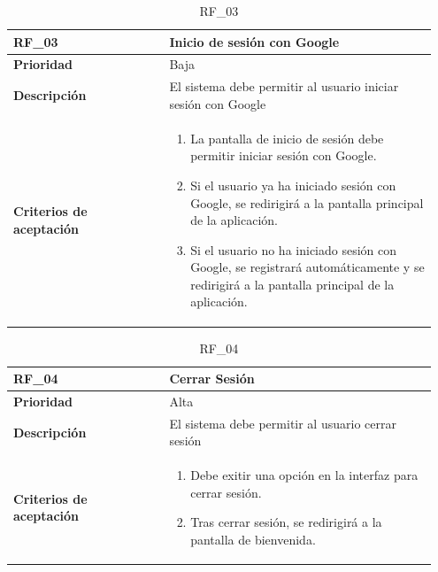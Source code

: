 \begin{table}[htb!]
    \begin{tabular}{|p{0.35\linewidth}|p{0.6\linewidth}|}
        \hline
        \rowcolor[HTML]{C0C0C0}  
        \textbf{RF\_03} & \textbf{Inicio de sesión con Google} \\
        \hline
        \textbf{Prioridad} & Baja \\
        \hline
        \textbf{Descripción} & El sistema debe permitir al usuario iniciar sesión con Google  \\
        \hline
        \vspace{0.5mm}
        \textbf{Criterios de aceptación} & 
        \begin{minipage}[t]{0.9\linewidth}
            \begin{enumerate}
                \item La pantalla de inicio de sesión debe permitir iniciar sesión con Google.
                \item Si el usuario ya ha iniciado sesión con Google, se redirigirá a la pantalla principal de la aplicación.
                \item Si el usuario no ha iniciado sesión con Google, se registrará automáticamente y se redirigirá a la pantalla principal de la aplicación.
            \end{enumerate}
            \vspace{2mm}
        \end{minipage} \\
        \hline
    \end{tabular}
    \caption{RF\_03}
\end{table}

\begin{table} [htb!]
    \begin{tabular}{|p{0.35\linewidth}|p{0.6\linewidth}|}
        \hline
        \rowcolor[HTML]{C0C0C0}  
        \textbf{RF\_04} & \textbf{Cerrar Sesión} \\
        \hline
        \textbf{Prioridad} & Alta \\
        \hline
        \textbf{Descripción} & El sistema debe permitir al usuario cerrar sesión  \\
        \hline
        \vspace{0.5mm}
        \textbf{Criterios de aceptación} & 
        \begin{minipage}[t]{0.9\linewidth}
            \begin{enumerate}
                \item Debe exitir una opción en la interfaz para cerrar sesión.
                \item Tras cerrar sesión, se redirigirá a la pantalla de bienvenida.
            \end{enumerate}
            \vspace{2mm}
        \end{minipage} \\
        \hline
    \end{tabular}
    \caption{RF\_04}
    \label{req:RF04}

\end{table}


